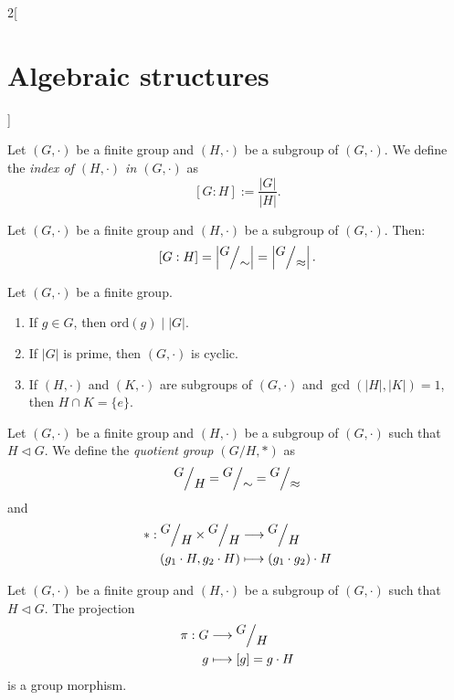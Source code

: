\documentclass[class=article,10pt,crop=false]{standalone}
\begin{document}
\begin{multicols}{2}[\section{Algebraic structures}]
\begin{definition}
Let $(G,\cdot)$ be a finite group and $(H,\cdot)$ be a subgroup of $(G,\cdot)$. We define the \textit{index of $(H,\cdot)$ in $(G,\cdot)$} as $$[G:H]:=\frac{|G|}{|H|}.$$
\end{definition}
\begin{corollary}
Let $(G,\cdot)$ be a finite group and $(H,\cdot)$ be a subgroup of $(G,\cdot)$. Then: $$[G:H]=\left|\quot{G}{\sim}\right|=\left|\quot{G}{\approx}\right|.$$
\end{corollary}
\begin{corollary}
Let $(G,\cdot)$ be a finite group. 
\begin{enumerate}
    \item If $g\in G$, then $\text{ord}(g)\mid |G|$.
    \item If $|G|$ is prime, then $(G,\cdot)$ is cyclic.
    \item If $(H,\cdot)$ and $(K,\cdot)$ are subgroups of $(G,\cdot)$ and $\gcd(|H|,|K|)=1$, then $H\cap K=\{e\}$.
\end{enumerate}
\end{corollary}
\begin{definition}
Let $(G,\cdot)$ be a finite group and $(H,\cdot)$ be a subgroup of $(G,\cdot)$ such that $H\lhd G$. We define the \textit{quotient group $\left(G/H,*\right)$} as $$\quot{G}{H}=\quot{G}{\sim}=\quot{G}{\approx}$$ and 
\begin{align*}
    *:\quot{G}{H}\times\quot{G}{H}&\longrightarrow\quot{G}{H}\\
    (g_1\cdot H,g_2\cdot H)&\longmapsto (g_1\cdot g_2)\cdot H
\end{align*}
\end{definition}
\begin{lemma}
Let $(G,\cdot)$ be a finite group and $(H,\cdot)$ be a subgroup of $(G,\cdot)$ such that $H\lhd G$. The projection 
\begin{align*}
    \pi:G&\longrightarrow\quot{G}{H}\\
    g&\longmapsto[g]=g\cdot H
\end{align*}
is a group morphism.
\end{lemma}

\end{multicols}
\end{document}
